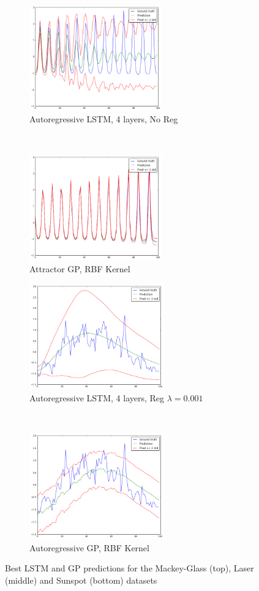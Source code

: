 \documentclass[pdftex,10pt,a4paper,journal]{article}
\theoremstyle{definition}
\theoremstyle{remark}
\begin{document}
\begin{multicols}{2}
\begin{figure}[ht]
    \begin{subfigure}[t]{0.5\textwidth}
        \centering
        \includegraphics[height=1.8in]{figs/laser_lstm.png}
        \caption{Autoregressive LSTM, 4 layers, No Reg}
    \end{subfigure}%
    ~ 
    \begin{subfigure}[t]{0.5\textwidth}
        \centering
        \includegraphics[height=1.8in]{figs/laser_gpatt52.png}
        \caption{Attractor GP, RBF Kernel}
    \end{subfigure}

    \begin{subfigure}[t]{0.5\textwidth}
        \centering
        \includegraphics[height=1.8in]{figs/sunspot_lstm.png}
        \caption{Autoregressive LSTM, 4 layers, Reg $\lambda = 0.001$}
    \end{subfigure}%
    ~ 
    \begin{subfigure}[t]{0.5\textwidth}
        \centering
        \includegraphics[height=1.8in]{figs/sunspot_gp32.png}
        \caption{Autoregressive GP, RBF Kernel}
    \end{subfigure}
    \caption{Best LSTM and GP predictions for the Mackey-Glass (top), Laser (middle) and Sunspot (bottom) datasets}\label{fig:bestpreds}
\end{figure}


\end{multicols}
\end{document}
